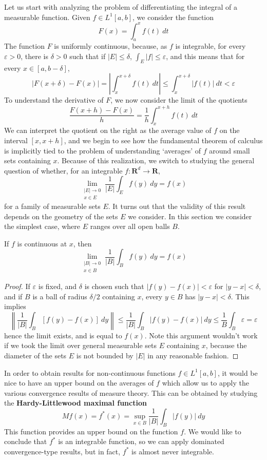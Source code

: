 Let us start with analyzing the problem of differentiating the integral of a measurable function. Given $f \in L^1[a,b]$, we consider the function
%
\[ F(x) = \int_a^x f(t)\ dt \]
%
The function $F$ is uniformly continuous, because, as $f$ is integrable, for every $\varepsilon > 0$, there is $\delta > 0$ such that if $|E| \leq \delta$, $\int_E |f| \leq \varepsilon$, and this means that for every $x \in [a,b-\delta]$,
%
\[ |F(x + \delta) - F(x)| = \left| \int_{x}^{x+\delta} f(t)\ dt \right| \leq \int_x^{x+\delta} |f(t)|\ dt < \varepsilon \]
%
To understand the derivative of $F$, we now consider the limit of the quotients
%
\[ \frac{F(x+h) - F(x)}{h} = \frac{1}{h} \int_x^{x+h} f(t)\ dt \]
%
We can interpret the quotient on the right as the average value of $f$ on the interval $[x,x+h]$, and we begin to see how the fundamental theorem of calculus is implicitly tied to the problem of understanding `averages' of $f$ around small sets containing $x$. Because of this realization, we switch to studying the general question of whether, for an integrable $f: \mathbf{R}^d \to \mathbf{R}$,
%
\[ \lim_{\substack{|E| \to 0\\x \in E}} \frac{1}{|E|} \int_E f(y)\ dy = f(x) \]
%
for a family of measurable sets $E$. It turns out that the validity of this result depends on the geometry of the sets $E$ we consider. In this section we consider the simplest case, where $E$ ranges over all open balls $B$.

\begin{lemma}
    If $f$ is continuous at $x$, then
    \[ \lim_{\substack{|B| \to 0\\x \in B}} \frac{1}{|B|} \int_B f(y)\ dy = f(x) \]
\end{lemma}
\begin{proof}
    If $\varepsilon$ is fixed, and $\delta$ is chosen such that $|f(y) - f(x)| < \varepsilon$ for $|y - x| < \delta$, and if $B$ is a ball of radius $\delta/2$ containing $x$, every $y \in B$ has $|y - x| < \delta$. This implies
    \[ \left\| \frac{1}{|B|} \int_B [f(y) - f(x)]\ dy \right\| \leq \frac{1}{|B|} \int_B |f(y) - f(x)|\ dy \leq \frac{1}{B} \int_B \varepsilon = \varepsilon \]
    hence the limit exists, and is equal to $f(x)$. Note this argument wouldn't work if we took the limit over general measurable sets $E$ containing $x$, because the diameter of the sets $E$ is not bounded by $|E|$ in any reasonable fashion.
\end{proof}

In order to obtain results for non-continuous functions $f \in L^1[a,b]$, it would be nice to have an upper bound on the averages of $f$ which allow us to apply the various convergence results of measure theory. This can be obtained by studying the {\bf Hardy-Littlewood maximal function}
%
\[ Mf(x) = f^*(x) = \sup_{x \in B} \frac{1}{|B|} \int_B |f(y)|\ dy \]
%
This function provides an upper bound on the function $f$. We would like to conclude that $f^*$ is an integrable function, so we can apply dominated convergence-type results, but in fact, $f^*$ is almost never integrable.

